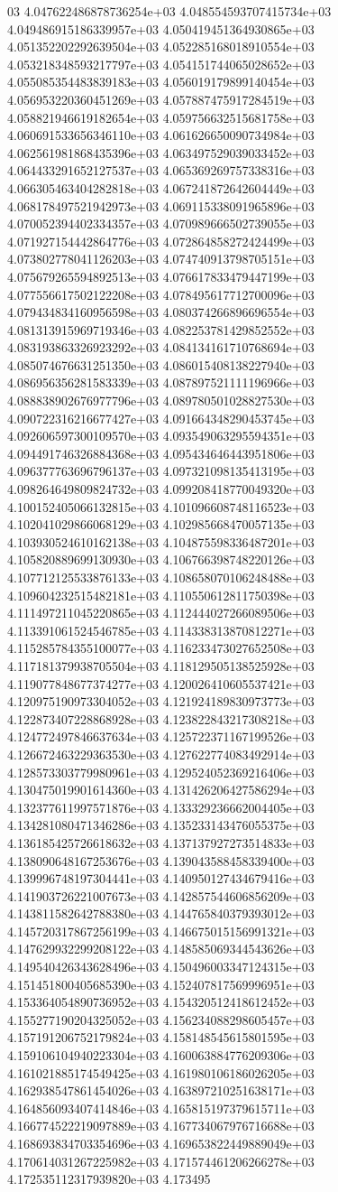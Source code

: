 03	4.047622486878736254e+03	4.048554593707415734e+03	4.049486915186339957e+03	4.050419451364930865e+03	4.051352202292639504e+03	4.052285168018910554e+03	4.053218348593217797e+03	4.054151744065028652e+03	4.055085354483839183e+03	4.056019179899140454e+03	4.056953220360451269e+03	4.057887475917284519e+03	4.058821946619182654e+03	4.059756632515681758e+03	4.060691533656346110e+03	4.061626650090734984e+03	4.062561981868435396e+03	4.063497529039033452e+03	4.064433291652127537e+03	4.065369269757338316e+03	4.066305463404282818e+03	4.067241872642604449e+03	4.068178497521942973e+03	4.069115338091965896e+03	4.070052394402334357e+03	4.070989666502739055e+03	4.071927154442864776e+03	4.072864858272424499e+03	4.073802778041126203e+03	4.074740913798705151e+03	4.075679265594892513e+03	4.076617833479447199e+03	4.077556617502122208e+03	4.078495617712700096e+03	4.079434834160956598e+03	4.080374266896696554e+03	4.081313915969719346e+03	4.082253781429852552e+03	4.083193863326923292e+03	4.084134161710768694e+03	4.085074676631251350e+03	4.086015408138227940e+03	4.086956356281583339e+03	4.087897521111196966e+03	4.088838902676977796e+03	4.089780501028827530e+03	4.090722316216677427e+03	4.091664348290453745e+03	4.092606597300109570e+03	4.093549063295594351e+03	4.094491746326884368e+03	4.095434646443951806e+03	4.096377763696796137e+03	4.097321098135413195e+03	4.098264649809824732e+03	4.099208418770049320e+03	4.100152405066132815e+03	4.101096608748116523e+03	4.102041029866068129e+03	4.102985668470057135e+03	4.103930524610162138e+03	4.104875598336487201e+03	4.105820889699130930e+03	4.106766398748220126e+03	4.107712125533876133e+03	4.108658070106248488e+03	4.109604232515482181e+03	4.110550612811750398e+03	4.111497211045220865e+03	4.112444027266089506e+03	4.113391061524546785e+03	4.114338313870812271e+03	4.115285784355100077e+03	4.116233473027652508e+03	4.117181379938705504e+03	4.118129505138525928e+03	4.119077848677374277e+03	4.120026410605537421e+03	4.120975190973304052e+03	4.121924189830973773e+03	4.122873407228868928e+03	4.123822843217308218e+03	4.124772497846637634e+03	4.125722371167199526e+03	4.126672463229363530e+03	4.127622774083492914e+03	4.128573303779980961e+03	4.129524052369216406e+03	4.130475019901614360e+03	4.131426206427586294e+03	4.132377611997571876e+03	4.133329236662004405e+03	4.134281080471346286e+03	4.135233143476055375e+03	4.136185425726618632e+03	4.137137927273514833e+03	4.138090648167253676e+03	4.139043588458339400e+03	4.139996748197304441e+03	4.140950127434679416e+03	4.141903726221007673e+03	4.142857544606856209e+03	4.143811582642788380e+03	4.144765840379393012e+03	4.145720317867256199e+03	4.146675015156991321e+03	4.147629932299208122e+03	4.148585069344543626e+03	4.149540426343628496e+03	4.150496003347124315e+03	4.151451800405685390e+03	4.152407817569996951e+03	4.153364054890736952e+03	4.154320512418612452e+03	4.155277190204325052e+03	4.156234088298605457e+03	4.157191206752179824e+03	4.158148545615801595e+03	4.159106104940223304e+03	4.160063884776209306e+03	4.161021885174549425e+03	4.161980106186026205e+03	4.162938547861454026e+03	4.163897210251638171e+03	4.164856093407414846e+03	4.165815197379615711e+03	4.166774522219097889e+03	4.167734067976716688e+03	4.168693834703354696e+03	4.169653822449889049e+03	4.170614031267225982e+03	4.171574461206266278e+03	4.172535112317939820e+03	4.173495